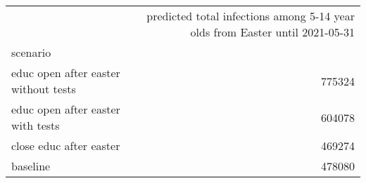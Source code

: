 \begin{tabular}{lr}
\toprule
{} &  predicted total infections among 5-14 year olds from Easter until 2021-05-31 \\
scenario                               &                                                                               \\
\midrule
 educ open after easter  without tests &                                             775324 \\
 educ open after easter  with tests    &                                             604078 \\
 close educ after easter               &                                             469274 \\
 baseline                              &                                             478080 \\
\bottomrule
\end{tabular}
